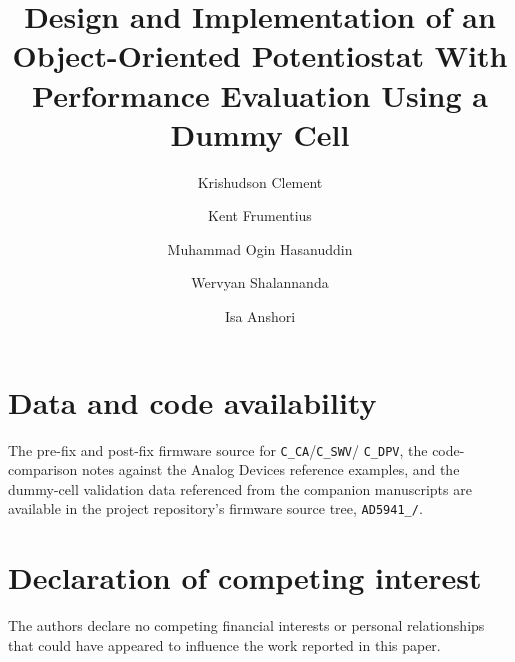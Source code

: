 \documentclass[preprint,12pt]{elsarticle}
\begin{document}
\begin{frontmatter}

\title{Design and Implementation of an Object-Oriented Potentiostat With
Performance Evaluation Using a Dummy Cell}

\author[itb]{Krishudson Clement}
\author[itb]{Kent Frumentius}
\author[itb,inha]{Muhammad Ogin Hasanuddin}
\author[itb]{Wervyan Shalannanda}
\author[itb]{Isa Anshori}




\end{frontmatter}








\section*{Data and code availability}
The pre-fix and post-fix firmware source for \texttt{C\_CA}/\texttt{C\_SWV}/
\texttt{C\_DPV}, the code-comparison notes against the Analog Devices
reference examples, and the dummy-cell validation data referenced from the
companion manuscripts are available in the project repository's firmware
source tree, \texttt{AD5941\_/}.

\section*{Declaration of competing interest}
The authors declare no competing financial interests or personal relationships
that could have appeared to influence the work reported in this paper.



\end{document}
